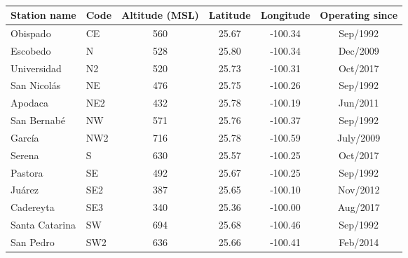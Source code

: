 \begin{table}[H]
    \begin{tabular}{llcccc} \hline
        Station name   & Code & Altitude (MSL) & Latitude & Longitude & Operating since \\ \hline
        Obispado       & CE   & 560            & 25.67    & -100.34   & Sep/1992        \\
        Escobedo       & N    & 528            & 25.80    & -100.34   & Dec/2009        \\
        Universidad    & N2   & 520            & 25.73    & -100.31   & Oct/2017        \\
        San Nicolás    & NE   & 476            & 25.75    & -100.26   & Sep/1992        \\
        Apodaca        & NE2  & 432            & 25.78    & -100.19   & Jun/2011        \\
        San Bernabé    & NW   & 571            & 25.76    & -100.37   & Sep/1992        \\
        García         & NW2  & 716            & 25.78    & -100.59   & July/2009       \\
        Serena         & S    & 630            & 25.57    & -100.25   & Oct/2017        \\
        Pastora        & SE   & 492            & 25.67    & -100.25   & Sep/1992        \\
        Juárez         & SE2  & 387            & 25.65    & -100.10   & Nov/2012        \\
        Cadereyta      & SE3  & 340            & 25.36    & -100.00   & Aug/2017        \\
        Santa Catarina & SW   & 694            & 25.68    & -100.46   & Sep/1992        \\
        San Pedro      & SW2  & 636            & 25.66    & -100.41   & Feb/2014        \\ \hline
    \end{tabular}
    \caption{}
    \label{table:stations_loc}
\end{table}